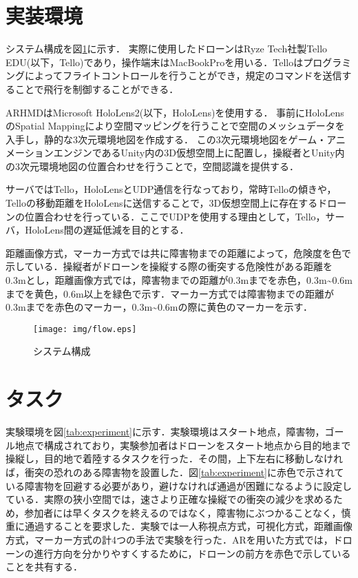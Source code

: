 \documentclass
[a4paper,11pt]{jreport}
\begin{document}
\section{実装環境}
システム構成を図\ref{tab:flow}に示す．
実際に使用したドローンはRyze Tech社製Tello EDU(以下，Tello)であり，操作端末はMacBookProを用いる．Telloはプログラミングによってフライトコントロールを行うことができ，規定のコマンドを送信することで飛行を制御することができる\cite{Tello}．
\par
ARHMDはMicrosoft HoloLens2(以下，HoloLens)\cite{HoloLens}を使用する．
事前にHoloLensのSpatial Mappingにより空間マッピングを行うことで空間のメッシュデータを入手し\cite{spatialmapping}，静的な3次元環境地図を作成する．
この3次元環境地図をゲーム・アニメーションエンジンであるUnity\cite{Unity}内の3D仮想空間上に配置し，操縦者とUnity内の3次元環境地図の位置合わせを行うことで，空間認識を提供する．
\par
サーバではTello，HoloLensとUDP通信を行なっており，常時Telloの傾きや，Telloの移動距離をHoloLensに送信することで，3D仮想空間上に存在するドローンの位置合わせを行っている．ここでUDPを使用する理由として，Tello，サーバ，HoloLens間の遅延低減を目的とする．
\par
距離画像方式，マーカー方式では共に障害物までの距離によって，危険度を色で示している．操縦者がドローンを操縦する際の衝突する危険性がある距離を0.3mとし，距離画像方式では，障害物までの距離が0.3mまでを赤色，0.3m\textasciitilde0.6mまでを黄色，0.6m以上を緑色で示す．マーカー方式では障害物までの距離が0.3mまでを赤色のマーカー，0.3m\textasciitilde 0.6mの際に黄色のマーカーを示す．

\begin{figure}[h]
	\begin{center}
    \texttt{[image: img/flow.eps]}
    \caption{システム構成}
    \label{tab:flow}
    \end{center}
\end{figure}


\section{タスク}
実験環境を図\ref{tab:experiment}に示す．実験環境はスタート地点，障害物，ゴール地点で構成されており，実験参加者はドローンをスタート地点から目的地まで操縦し，目的地で着陸するタスクを行った．その間，上下左右に移動しなければ，衝突の恐れのある障害物を設置した．図\ref{tab:experiment}に赤色で示されている障害物を回避する必要があり，避けなければ通過が困難になるように設定している．実際の狭小空間では，速さより正確な操縦での衝突の減少を求めるため，参加者には早くタスクを終えるのではなく，障害物にぶつかることなく，慎重に通過することを要求した．実験では一人称視点方式，可視化方式，距離画像方式，マーカー方式の計4つの手法で実験を行った．ARを用いた方式では，ドローンの進行方向を分かりやすくするために，ドローンの前方を赤色で示していることを共有する．
\end{document}

